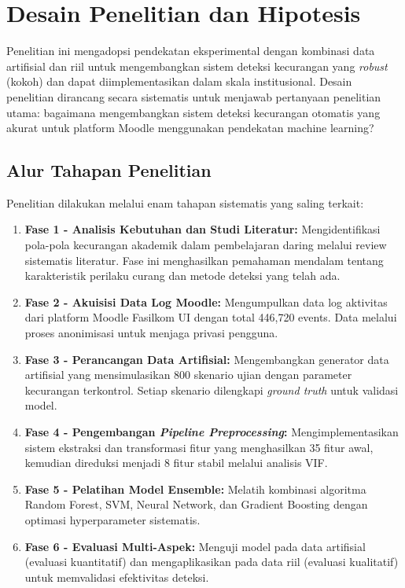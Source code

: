 \section{Desain Penelitian dan Hipotesis}
\label{sec:desainPenelitian}
Penelitian ini mengadopsi pendekatan eksperimental dengan kombinasi data artifisial dan riil untuk mengembangkan sistem deteksi kecurangan yang \textit{robust} (kokoh) dan dapat diimplementasikan dalam skala institusional. Desain penelitian dirancang secara sistematis untuk menjawab pertanyaan penelitian utama: bagaimana mengembangkan sistem deteksi kecurangan otomatis yang akurat untuk platform Moodle menggunakan pendekatan machine learning?

\subsection{Alur Tahapan Penelitian}
\label{subsec:alurTahapanPenelitian}
Penelitian dilakukan melalui enam tahapan sistematis yang saling terkait:

\begin{enumerate}
    \item \textbf{Fase 1 - Analisis Kebutuhan dan Studi Literatur:} Mengidentifikasi pola-pola kecurangan akademik dalam pembelajaran daring melalui review sistematis literatur. Fase ini menghasilkan pemahaman mendalam tentang karakteristik perilaku curang dan metode deteksi yang telah ada.
    
    \item \textbf{Fase 2 - Akuisisi Data Log Moodle:} Mengumpulkan data log aktivitas dari platform Moodle Fasilkom UI dengan total 446,720 events. Data melalui proses anonimisasi untuk menjaga privasi pengguna.
    
    \item \textbf{Fase 3 - Perancangan Data Artifisial:} Mengembangkan generator data artifisial yang mensimulasikan 800 skenario ujian dengan parameter kecurangan terkontrol. Setiap skenario dilengkapi \textit{ground truth} untuk validasi model.
    
    \item \textbf{Fase 4 - Pengembangan \textit{Pipeline Preprocessing}:} Mengimplementasikan sistem ekstraksi dan transformasi fitur yang menghasilkan 35 fitur awal, kemudian direduksi menjadi 8 fitur stabil melalui analisis VIF.
    
    \item \textbf{Fase 5 - Pelatihan Model Ensemble:} Melatih kombinasi algoritma Random Forest, SVM, Neural Network, dan Gradient Boosting dengan optimasi hyperparameter sistematis.
    
    \item \textbf{Fase 6 - Evaluasi Multi-Aspek:} Menguji model pada data artifisial (evaluasi kuantitatif) dan mengaplikasikan pada data riil (evaluasi kualitatif) untuk memvalidasi efektivitas deteksi.
\end{enumerate}

